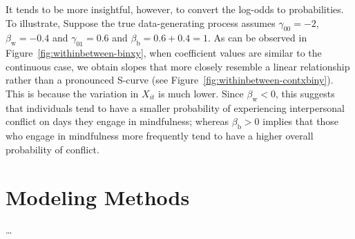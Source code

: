\documentclass[stu]{apa7}
\begin{document}

 It tends to be more insightful, however, to convert the log-odds to probabilities. To illustrate, Suppose the true data-generating process assumes $\gamma_{00} = -2$, \(\beta_\text{w} = -0.4\) and \(\gamma_{01} = 0.6\) and \(\beta_\text{b} = 0.6 + 0.4 = 1\). As can be observed in Figure~\ref{fig:withinbetween-binxy}, when coefficient values are similar to the continuous case, we obtain slopes that more closely resemble a linear relationship rather than a pronounced S-curve (see Figure~\ref{fig:withinbetween-contxbiny}). This is because the variation in $X_{it}$ is much lower. Since \(\beta_\text{w} < 0\), this suggests that individuals tend to have a smaller probability of experiencing interpersonal conflict on days they engage in mindfulness; whereas \(\beta_\text{b} > 0\) implies that those who engage in mindfulness more frequently tend to have a higher overall probability of conflict.

 

\section{Modeling Methods}

\ldots
\end{document}
